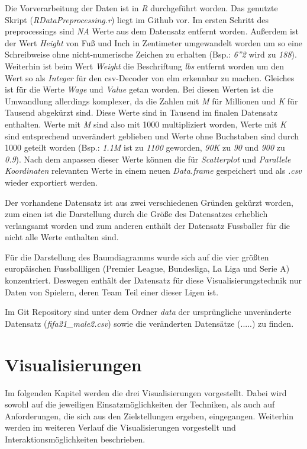 \documentclass[usegeometry=true]{scrartcl}
\begin{document}
Die Vorverarbeitung der Daten ist in \textit{R} durchgeführt worden. Das genutzte Skript (\textit{RDataPreprocessing.r}) liegt im Github vor.
Im ersten Schritt des preprocessings sind \textit{NA} Werte aus dem Datensatz entfernt worden.
Außerdem ist der Wert \textit{Height} von Fuß und Inch in Zentimeter umgewandelt worden um so eine Schreibweise ohne nicht-numerische Zeichen zu erhalten (Bsp.: \textit{6''2} wird zu \textit{188}). Weiterhin ist beim Wert \textit{Weight} die Beschriftung \textit{lbs} entfernt worden um den Wert so als \textit{Integer} für den csv-Decoder von elm erkennbar zu machen.
Gleiches ist für die Werte \textit{Wage} und \textit{Value} getan worden. Bei diesen Werten ist die Umwandlung allerdings komplexer, da die Zahlen mit \textit{M} für Millionen und \textit{K} für Tausend abgekürzt sind.
Diese Werte sind in Tausend im finalen Datensatz enthalten. Werte mit \textit{M} sind also mit 1000 multipliziert worden, Werte mit \textit{K} sind entsprechend unverändert geblieben und Werte ohne Buchstaben sind durch 1000 geteilt worden (Bsp.: \textit{1.1M} ist zu \textit{1100} geworden, \textit{90K} zu \textit{90} und \textit{900} zu \textit{0.9}).
Nach dem anpassen dieser Werte können die für \textit{Scatterplot} und \textit{Parallele Koordinaten} relevanten Werte in einem neuen \textit{Data.frame} gespeichert und als \textit{.csv} wieder exportiert werden.  


Der vorhandene Datensatz ist aus zwei verschiedenen Gründen gekürzt worden, zum einen ist die Darstellung durch die Größe des Datensatzes erheblich verlangsamt worden und zum anderen enthält der Datensatz Fussballer für die nicht alle Werte enthalten sind.

Für die Darstellung des Baumdiagramms wurde sich auf die vier größten europäischen Fussballligen (Premier League, Bundesliga, La Liga und Serie A) konzentriert. Deswegen enthält der Datensatz für diese Visualisierungstechnik nur Daten von Spielern, deren Team Teil einer dieser Ligen ist.

Im Git Repository sind unter dem Ordner \textit{data} der ursprüngliche unveränderte Datensatz (\textit{fifa21\_male2.csv}) sowie die veränderten Datensätze (.....) zu finden.

\section{Visualisierungen}
Im folgenden Kapitel werden die drei Visualisierungen vorgestellt. Dabei wird sowohl auf die jeweiligen Einsatzmöglichkeiten der Techniken, als auch auf Anforderungen, die sich aus den Zielstellungen ergeben, eingegangen. Weiterhin werden im weiteren Verlauf die Visualisierungen vorgestellt und Interaktionsmöglichkeiten beschrieben.  
\end{document}
